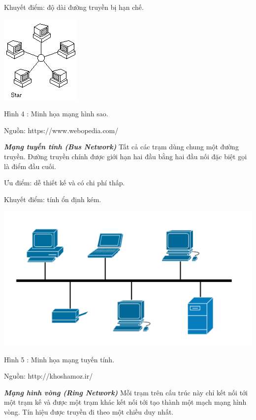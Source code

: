 \documentclass{report}
\begin{document}
Khuyết điểm: độ dài đường truyền bị hạn chế.


\begin{center}
     \includegraphics[scale=1]{star}
\end{center}
\centerline{Hình 4 : Minh họa mạng hình sao.}
\changefontsizes{12pt}
\centerline{Nguồn: https://www.webopedia.com/}

\changefontsizes{13pt}
\bigskip
\setlength{\parindent}{0.2cm}
\textbf{\textit{Mạng tuyến tính (Bus Network)}} Tất cả các trạm dùng chung một đường truyền. Đường truyền chính được giới hạn hai đầu bằng hai đầu nối đặc biệt gọi là điểm đầu cuối. 

\smallskip
\setlength{\parindent}{1cm}
Ưu điểm: dễ thiết kế và có chi phí thấp.

Khuyết điểm: tính ổn định kém.


\begin{center}
     \includegraphics[scale=0.375]{bus}
\end{center}
\centerline{Hình 5 : Minh họa mạng tuyến tính.}
\changefontsizes{12pt}
\centerline{Nguồn: http://khoshamoz.ir/}

\bigskip
\changefontsizes{13pt}
\setlength{\parindent}{0.2cm}
\textbf{\textit{Mạng hình vòng (Ring Network)}} Mỗi trạm trên cấu trúc này chỉ kết nối tới một trạm kế và được một trạm khác kết nối tới tạo thành một mạch mạng hình vòng. Tín hiệu được truyền đi theo một chiều duy nhất.
\end{document}
